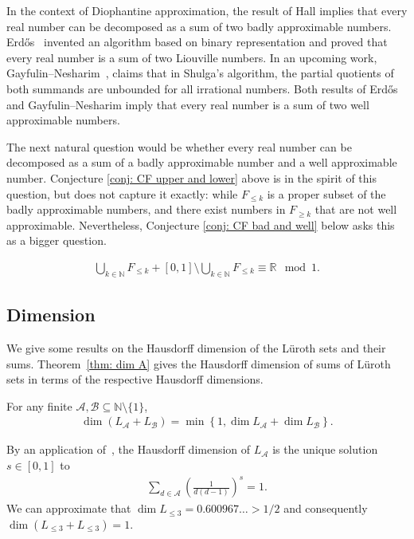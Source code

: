 \documentclass{ws-ijnt}
\begin{document}
	In the context of Diophantine approximation, the result of Hall implies that every real number can be decomposed as a sum of two badly approximable numbers. Erd\H{o}s~\cite{erdHos1962representations} invented an algorithm based on binary representation and proved that every real number is a sum of two Liouville numbers. In an upcoming work, Gayfulin--Nesharim~\cite{gayfulin2025realnumbersumreal}, claims that in Shulga's algorithm, the partial quotients of both summands are unbounded for all irrational numbers. Both results of Erd\H{o}s and Gayfulin--Nesharim imply that every real number is a sum of two well approximable numbers.
	
	The next natural question would be whether every real number can be decomposed as a sum of a badly approximable number and a well approximable number. Conjecture \ref{conj: CF upper and lower} above is in the spirit of this question, but does not capture it exactly: while $F_{\leq k}$ is a proper subset of the badly approximable numbers, and there exist numbers in $F_{\geq k}$ that are not well approximable. Nevertheless, Conjecture \ref{conj: CF bad and well} below asks this as a bigger question.
	\begin{conjecture}\label{conj: CF bad and well}
		\begin{align*}
			\bigcup_{k\in\mathbb{N}}F_{\leq k}+[0,1]\setminus\bigcup_{k\in\mathbb{N}}F_{\leq k}\equiv\mathbb{R}\mod1.
		\end{align*}
	\end{conjecture}
	
	\subsection{Dimension}\label{section: dimension}
	We give some results on the Hausdorff dimension of the L\"uroth sets and their sums. Theorem~\ref{thm: dim A} gives the Hausdorff dimension of sums of L\"uroth sets in terms of the respective Hausdorff dimensions.
	\begin{theorem}\label{thm: dim A}
		For any finite $\mathcal{A},\mathcal{B}\subseteq\mathbb{N}\setminus\{1\}$,
		\begin{align*}
			\dim{(L_\mathcal{A}+L_\mathcal{B})}
			=\min{\left\{1,\dim{L_\mathcal{A}}+\dim{L_\mathcal{B}}\right\}}.
		\end{align*}
	\end{theorem}
	By an application of~\cite[Theorem II]{Moran_1946}, the Hausdorff dimension of $L_{\mathcal{A}}$ is the unique solution $s\in[0,1]$ to 
	\begin{align*}
		\sum_{d\in\mathcal{A}}
		\left(\frac{1}{d(d-1)}\right)^{s} = 1.
	\end{align*}
	We can approximate that $\dim L_{\leq 3}=0.600967\ldots>1/2$ and consequently $\dim(L_{\leq 3}+L_{\leq 3})=1$.
	
\end{document}

